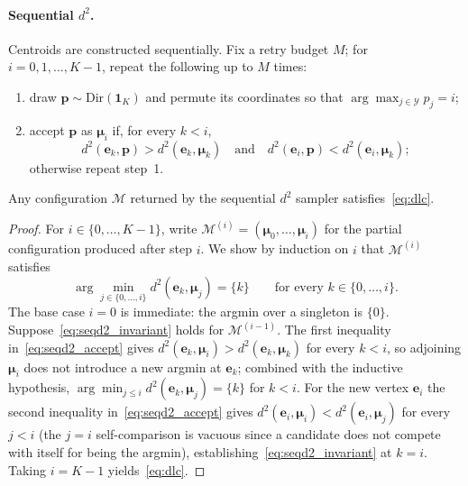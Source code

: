 \paragraph{Sequential $d^2$.} Centroids are constructed sequentially. Fix a retry budget $M$; for $i = 0, 1, \ldots, K-1$, repeat the following up to $M$ times:
\begin{enumerate}
    \item draw $\mathbf{p} \sim \mathrm{Dir}(\mathbf{1}_K)$ and permute its coordinates so that $\arg\max_{j \in \mathcal{Y}} p_j = i$;
    \item accept $\mathbf{p}$ as $\boldsymbol{\mu}_i$ if, for every $k < i$,
    \begin{equation}
        d^2(\mathbf{e}_k, \mathbf{p}) > d^2(\mathbf{e}_k, \boldsymbol{\mu}_k) \quad \text{and} \quad d^2(\mathbf{e}_i, \mathbf{p}) < d^2(\mathbf{e}_i, \boldsymbol{\mu}_k);
        \label{eq:seqd2_accept}
    \end{equation}
    otherwise repeat step~1.
\end{enumerate}

\begin{proposition}\label{prop:seqd2_correct}
Any configuration $\mathcal{M}$ returned by the sequential $d^2$ sampler satisfies~\eqref{eq:dlc}.
\end{proposition}

\begin{proof}
For $i \in \{0,\ldots,K-1\}$, write $\mathcal{M}^{(i)} = (\boldsymbol{\mu}_0,\ldots,\boldsymbol{\mu}_i)$ for the partial configuration produced after step $i$. We show by induction on $i$ that $\mathcal{M}^{(i)}$ satisfies
\begin{equation}
    \arg\min_{j \in \{0,\ldots,i\}} d^2(\mathbf{e}_k, \boldsymbol{\mu}_j) = \{k\} \qquad \text{for every } k \in \{0,\ldots,i\}.
    \label{eq:seqd2_invariant}
\end{equation}
The base case $i = 0$ is immediate: the argmin over a singleton is $\{0\}$. Suppose~\eqref{eq:seqd2_invariant} holds for $\mathcal{M}^{(i-1)}$. The first inequality in~\eqref{eq:seqd2_accept} gives $d^2(\mathbf{e}_k, \boldsymbol{\mu}_i) > d^2(\mathbf{e}_k, \boldsymbol{\mu}_k)$ for every $k < i$, so adjoining $\boldsymbol{\mu}_i$ does not introduce a new argmin at $\mathbf{e}_k$; combined with the inductive hypothesis, $\arg\min_{j \leq i} d^2(\mathbf{e}_k, \boldsymbol{\mu}_j) = \{k\}$ for $k < i$. For the new vertex $\mathbf{e}_i$ the second inequality in~\eqref{eq:seqd2_accept} gives $d^2(\mathbf{e}_i, \boldsymbol{\mu}_i) < d^2(\mathbf{e}_i, \boldsymbol{\mu}_j)$ for every $j < i$ (the $j = i$ self-comparison is vacuous since a candidate does not compete with itself for being the argmin), establishing~\eqref{eq:seqd2_invariant} at $k = i$. Taking $i = K-1$ yields~\eqref{eq:dlc}.
\end{proof}

